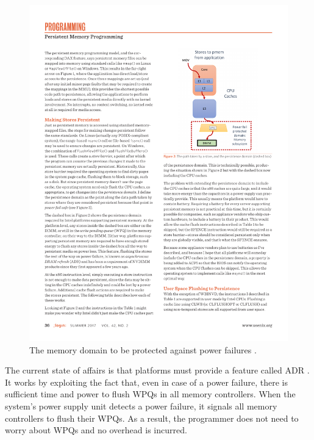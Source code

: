 \begin{figure}[h!]
    \centering
    \includegraphics{figures/nvram/adr-example.pdf}
    \captionsetup{justification=centering}
    \caption{The memory domain to be protected against power failures \cite{rudoff2017persistent}.}
    \label{fig:wpq}
\end{figure}

The current state of affairs is that platforms must provide a feature called
\ac{ADR} \cite{volos2017whisper, rudoff2017persistent}. It works by exploiting
the fact that, even in case of a power failure, there is sufficient time and
power to flush \acp{WPQ} in all memory controllers. When the system's power
supply unit detects a power failure, it signals all memory controllers to flush
their \acp{WPQ}. As a result, the programmer does not need to worry about
\acp{WPQ} and no overhead is incurred.
